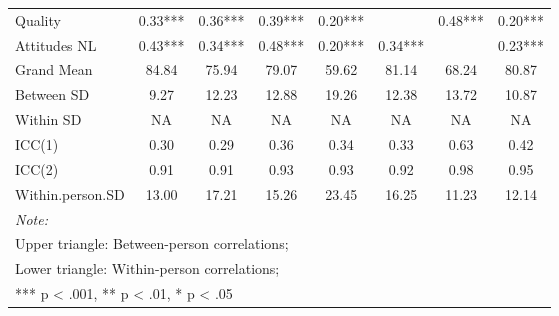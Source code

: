 \begin{table}
\begin{minipage}[t][\textheight][t]{\textwidth}
{\begin{tabular}[t]{lccccccc}
\hspace{1em}Quality & 0.33*** & 0.36*** & 0.39*** & 0.20*** &  & 0.48*** & 0.20***\\
\hspace{1em}Attitudes NL & 0.43*** & 0.34*** & 0.48*** & 0.20*** & 0.34*** &  & 0.23***\\
\addlinespace
\hspace{1em}Grand Mean & 84.84 & 75.94 & 79.07 & 59.62 & 81.14 & 68.24 & 80.87\\
\hspace{1em}Between SD & 9.27 & 12.23 & 12.88 & 19.26 & 12.38 & 13.72 & 10.87\\
\hspace{1em}Within SD & NA & NA & NA & NA & NA & NA & NA\\
\hspace{1em}ICC(1) & 0.30 & 0.29 & 0.36 & 0.34 & 0.33 & 0.63 & 0.42\\
\hspace{1em}ICC(2) & 0.91 & 0.91 & 0.93 & 0.93 & 0.92 & 0.98 & 0.95\\
\hspace{1em}Within.person.SD & 13.00 & 17.21 & 15.26 & 23.45 & 16.25 & 11.23 & 12.14\\
\bottomrule
\multicolumn{8}{l}{\rule{0pt}{1em}\textit{Note: }}\\
\multicolumn{8}{l}{\rule{0pt}{1em}Upper triangle: Between-person correlations;}\\
\multicolumn{8}{l}{\rule{0pt}{1em}Lower triangle: Within-person correlations;}\\
\multicolumn{8}{l}{\rule{0pt}{1em}*** p < .001, ** p < .01,  * p < .05}\\
\end{tabular}}
\end{minipage}
\end{table}
